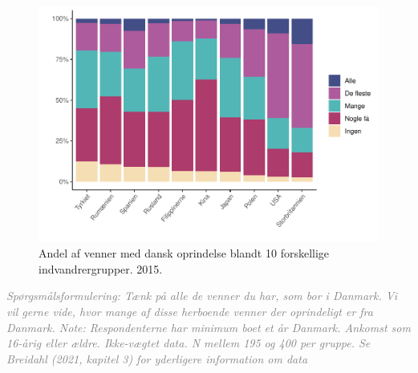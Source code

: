 \documentclass[
]{book}
\begin{document}
\begin{figure}
\includegraphics[width=1\linewidth]{en-befolkning-blander-sig_files/figure-latex/fig-6-3-1} \caption{Andel af venner med dansk oprindelse blandt 10 forskellige indvandrergrupper. 2015.}\label{fig:fig-6-3}
\end{figure}

\begin{footnotesize}\textit{\textcolor{gray}{
Spørgsmålsformulering: Tænk på alle de venner du har, som bor i Danmark. Vi vil gerne vide, hvor mange af disse herboende venner der oprindeligt er fra Danmark. Note: Respondenterne har minimum boet et år Danmark. Ankomst som 16-årig eller ældre. Ikke-vægtet data. N mellem 195 og 400 per gruppe. Se Breidahl (2021, kapitel 3) for yderligere information om data
}}
\end{footnotesize}
\end{document}
